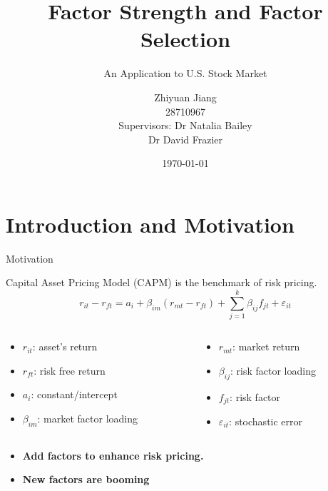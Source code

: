 \documentclass[12pt]{beamer}
\title{Factor Strength and Factor Selection }
\subtitle{An Application to U.S. Stock Market}
\date{\today}
\author[author]{Zhiyuan Jiang\\
			28710967\\
			[10mm]
            Supervisors: Dr Natalia Bailey \\ 
			\hspace{18.5mm} 
			Dr David Frazier}
\begin{document}
	
\frame[plain]{\titlepage}

\section{Introduction and Motivation}

\begin{frame}{Motivation}
	
Capital Asset Pricing Model (CAPM) is the benchmark of risk pricing.
\[r_{it} - r_{ft} = a_i + \beta_{im}(r_{mt} - r_{ft}) + \sum_{j=1}^{k}\beta_{ij}f_{jt} + \varepsilon_{it} \]

\begin{columns}
	\begin{column}{0.5\textwidth}
\begin{itemize}
\item $r_{it}$: asset's return
\item $r_{ft}$: risk free return
\item $a_i$: constant/intercept
\item $\beta_{im}$: market factor loading
\end{itemize}
	\end{column}
	\begin{column}{0.5\textwidth}  
		\begin{center}
\begin{itemize}
\item $r_{mt}$: market return 
\item$\beta_{ij}$: risk factor loading
\item $f_{jt}$: risk factor
\item $\varepsilon_{it}$: stochastic error
\end{itemize}
		\end{center}
	\end{column}
\end{columns}
\begin{itemize}
\item{\bf Add factors to enhance risk pricing.}
\item{\bf  New factors are booming }
\end{itemize}

\end{frame}
\end{document}
